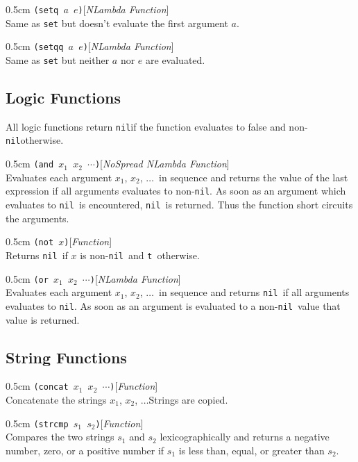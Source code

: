 \documentclass[a4paper]{article}
\newcommand{\lisp}[1]{\texttt{#1}}
\newcommand{\T}{\lisp{t}}
\newcommand{\NIL}{\lisp{nil}}
\newcommand{\xargs}{$x_{1}$ $x_{2}$ $\cdots$}
\newcommand{\largs}{$x_{1}$, $x_{2}$, $\ldots$}
\newenvironment{defun}[2]{\begin{adjustwidth}{0.5cm}{}
    {\hspace*{-0.5cm}\lisp{#2}\hfill[\textit{#1}]\\}}
               {\end{adjustwidth}}
\begin{document}
\begin{defun}{NLambda Function}{(setq $a$ $e$)}
  Same as \lisp{set} but doesn't evaluate the first argument $a$.
\end{defun}

\begin{defun}{NLambda Function}{(setqq $a$ $e$)}
  Same as \lisp{set} but neither $a$ nor $e$ are evaluated.
\end{defun}

\subsection{Logic Functions}
All logic functions return \NIL if the function evaluates to false and
non-\NIL otherwise.

\begin{defun}{NoSpread NLambda Function}{(and \xargs)}
  Evaluates each argument \largs\ in sequence and returns the value of
  the last expression if all arguments evaluates to non-\NIL. As soon
  as an argument which evaluates to \NIL\ is encountered, \NIL\ is
  returned. Thus the function short circuits the arguments.
\end{defun}

\begin{defun}{Function}{(not $x$)}
  Returns \NIL\ if $x$ is non-\NIL\ and \T\ otherwise.
\end{defun}


\begin{defun}{NLambda Function}{(or \xargs)}
  Evaluates each argument \largs\ in sequence and returns \NIL\ if all
  arguments evaluates to \NIL. As soon as an argument is evaluated to
  a non-\NIL\ value that value is returned.
\end{defun}

\subsection{String Functions}

\begin{defun}{Function}{(concat \xargs)}
  Concatenate the strings \largs Strings are copied.
\end{defun}

\begin{defun}{Function}{(strcmp $s_{1}$ $s_{2}$)}
  Compares the two strings $s_{1}$ and $s_{2}$ lexicographically and
  returns a negative number, zero, or a positive number if $s_{1}$ is
  less than, equal, or greater than $s_{2}$.
\end{defun}
\end{document}
